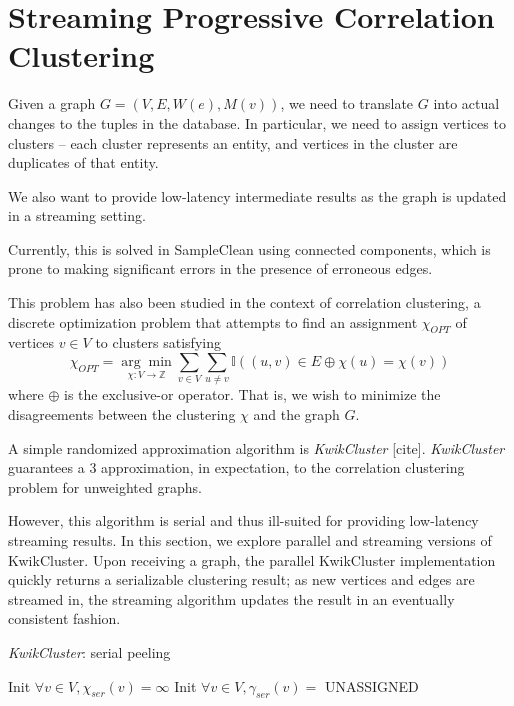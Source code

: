 \section{Streaming Progressive Correlation Clustering}
Given a graph $G = (V, E, W(e), M(v))$, we need to translate $G$ into actual changes to the tuples in the database.
In particular, we need to assign vertices to clusters -- each cluster represents an entity, and vertices in the cluster are duplicates of that entity.

We also want to provide low-latency intermediate results as the graph is updated in a streaming setting.

Currently, this is solved in SampleClean using connected components, which is prone to making significant errors in the presence of erroneous edges.

This problem has also been studied in the context of correlation clustering, a discrete optimization problem that attempts to find an assignment $\chi_{OPT}$ of vertices $v\in V$ to clusters satisfying
\[
\chi_{OPT} = \underset{\chi: V \rightarrow \mathbb{Z}}{\arg\min} \sum_{v \in V} \sum_{u \neq v} \mathbb{I}((u,v) \in E \oplus \chi(u) = \chi(v))
\]
where $\oplus$ is the exclusive-or operator.
That is, we wish to minimize the disagreements between the clustering $\chi$ and the graph $G$.

A simple randomized approximation algorithm is \emph{KwikCluster} [cite]. 
\emph{KwikCluster} guarantees a 3 approximation, in expectation, to the correlation clustering problem for unweighted graphs.

However, this algorithm is serial and thus ill-suited for providing low-latency streaming results.
In this section, we explore parallel and streaming versions of KwikCluster.
Upon receiving a graph, the parallel KwikCluster implementation quickly returns a serializable clustering result;
as new vertices and edges are streamed in, the streaming algorithm updates the result in an eventually consistent fashion.

      \begin{algorithm}[h]
        \DontPrintSemicolon
        \caption{{\it KwikCluster}: serial peeling}
        \label{alg:seqgreedy}
        Init $\forall v\in V, \chi_{ser}(v) = \infty$\;
        Init $\forall v\in V, \gamma_{ser}(v) = $ UNASSIGNED\;
      \end{algorithm}

